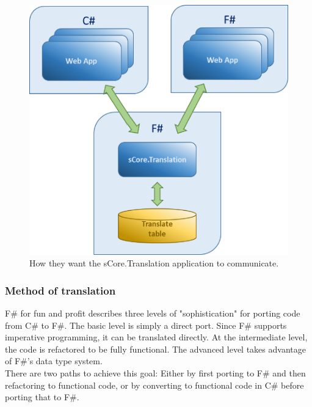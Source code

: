 \documentclass[12pt, a4paper]{article}
\begin{document}
\begin{figure}[!h]
    \includegraphics[scale=0.5]{image02}
    \centering
    \caption{How they want the sCore.Translation application to communicate.}
\end{figure}

\newpage
\subsubsection{Method of translation}
F\# for fun and profit describes three levels of "sophistication" for porting code from C\# to F\#. The basic level is simply a direct port. Since F\# supports imperative programming, it can be translated directly. At the intermediate level, the code is refactored to be fully functional. The advanced level takes advantage of F\#’s data type system.\\

There are two paths to achieve this goal: Either by first porting to F\# and then refactoring to functional code, or by converting to functional code in C\# before porting that to F\#.
\end{document}
